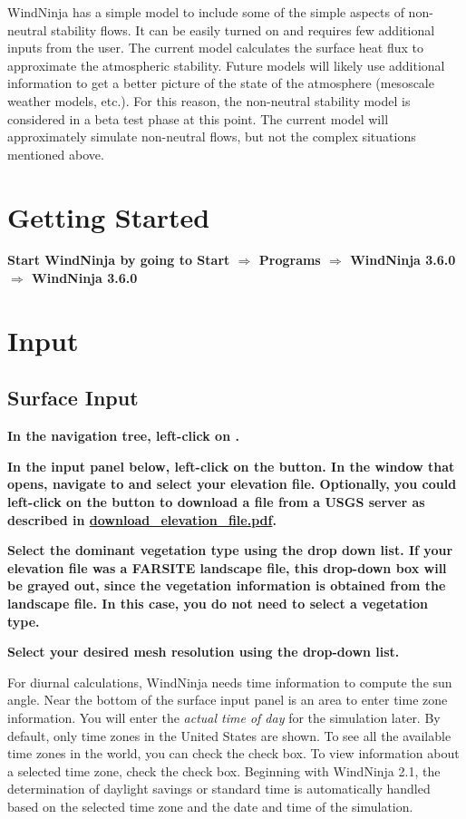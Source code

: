 \documentclass[12pt]{article}
\newcommand\vn{3.6.0}
\begin{document}
WindNinja has a simple model to include some of the simple aspects of non-neutral stability flows.  It can be easily turned on and requires few additional inputs from the user.  The current model calculates the surface heat flux to approximate the atmospheric stability.  Future models will likely use additional information to get a better picture of the state of the atmosphere (mesoscale weather models, etc.).  For this reason, the non-neutral stability model is considered in a beta test phase at this point.  The current model will approximately simulate non-neutral flows, but not the complex situations mentioned above.

\section{Getting Started}

\textbf{\color{red}Start WindNinja by going to Start $\Rightarrow$ Programs $\Rightarrow$ WindNinja \vn\ $\Rightarrow$ WindNinja \vn\ }

\section{Input}
\subsection{Surface Input}

\textbf{\color{red} In the navigation tree, left-click on .}


\textbf{\color{red} In the input panel below, left-click on the  button.  In the window that opens, navigate to and select your elevation file.  Optionally, you could left-click on the  button to download a file from a USGS server as described in \href{https://weather.firelab.org/windninja/tutorials/fetch_dem_instructions.pdf}{download\_elevation\_file.pdf}.}

\textbf{\color{red} Select the dominant vegetation type using the  drop down list.  If your elevation file was a FARSITE landscape file, this drop-down box will be grayed out, since the vegetation information is obtained from the landscape file.  In this case, you do not need to select a vegetation type.}

\textbf{\color{red}
Select your desired mesh resolution using the  drop-down list.}

For diurnal calculations, WindNinja needs time information to compute the sun angle.  Near the bottom of the surface input panel is an area to enter time zone information.  You will enter the \textit{actual time of day} for the simulation later.  By default, only time zones in the United States are shown.  To see all the available time zones in the world, you can check the  check box.  To view information about a selected time zone, check the  check box.  Beginning with WindNinja 2.1, the determination of daylight savings or standard time is automatically handled based on the selected time zone and the date and time of the simulation.
\end{document}
